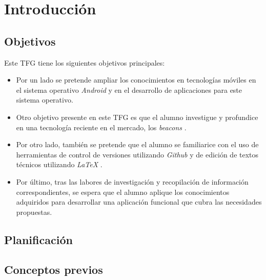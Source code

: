 %
%


\chapter{Introducción} \label{chap:Introducción}  

\section{Objetivos}

Este TFG tiene los siguientes objetivos principales:

	
\begin{itemize}
\item  	Por un lado se pretende ampliar los conocimientos en tecnologías móviles en el sistema operativo \textit{Android} \cite{URL::Android} y en el desarrollo de aplicaciones para este sistema operativo.
\item Otro objetivo presente en este TFG es que el alumno investigue y profundice en una tecnología reciente en el mercado, los \textit{beacons} \cite{URL::Beacon}.
\item Por otro lado, también se pretende que el alumno se familiarice con el uso de herramientas de control de versiones utilizando \textit{Github} \cite{URL::Github} y de edición de textos técnicos utilizando \textit{LaTeX}  \cite{URL::LaTeX}.
\item  Por último, tras las labores de investigación y recopilación de información correspondientes, se espera que el alumno aplique los conocimientos adquiridos para desarrollar una aplicación funcional que cubra las necesidades propuestas.
\end{itemize}

\section{Planificación}

\section{Conceptos previos}